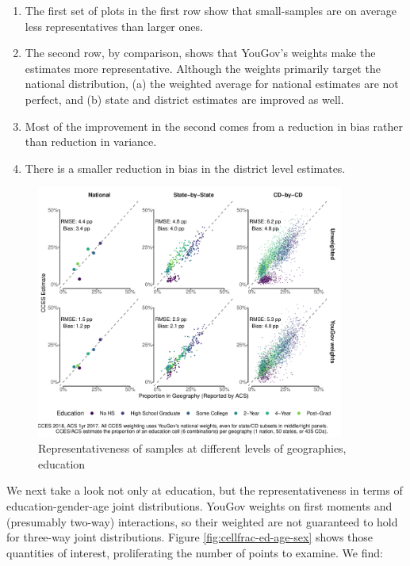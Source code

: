 \documentclass[11pt]{article}
\begin{document}
\begin{enumerate}
\item The first set of plots in the first row show that small-samples are on average less representatives than larger ones.
\item The second row, by comparison, shows that YouGov's weights make the estimates more representative. Although the weights primarily target the national distribution, (a) the weighted average for national estimates are not perfect, and (b) state and district estimates are improved as well. 
\item Most of the improvement in the second comes from a reduction in bias rather than reduction in variance. 
\item There is a smaller reduction in bias in the district level estimates.
\end{enumerate}
\begin{figure}[bh]
\caption{Representativeness of samples at different levels of geographies, education \label{fig:cellfrac-ed}}
\centering
\includegraphics[width = 0.9\textwidth]{figures/educfrac-comparisons.pdf}
\end{figure}

\FloatBarrier

We next take a look not only at education, but the representativeness in terms of education-gender-age joint distributions. YouGov weights on first moments and (presumably two-way) interactions, so their weighted are not guaranteed to hold for three-way joint distributions.  Figure \ref{fig:cellfrac-ed-age-sex} shows those quantities of interest, proliferating the number of points to examine. We find:
\end{document}
